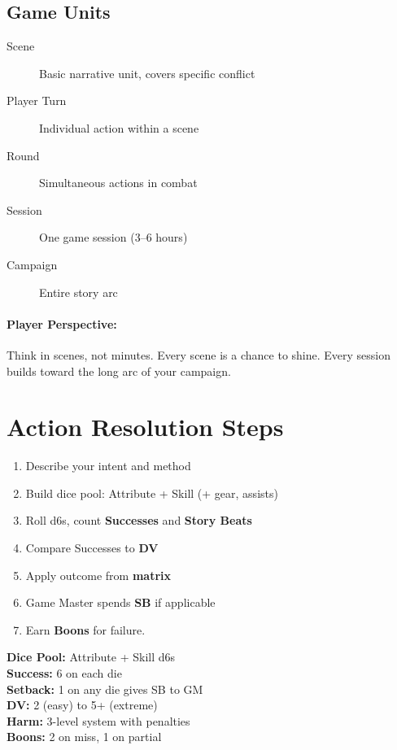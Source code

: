 \subsection*{Game Units}
\begin{description}
  \item[Scene] Basic narrative unit, covers specific conflict
  \item[Player Turn] Individual action within a scene
  \item[Round] Simultaneous actions in combat
  \item[Session] One game session (3--6 hours)
  \item[Campaign] Entire story arc
\end{description}

\paragraph{Player Perspective:}  
Think in scenes, not minutes. Every scene is a chance to shine. Every session builds toward the long arc of your campaign.

\section{Action Resolution Steps}

\begin{enumerate}
  \item Describe your intent and method
  \item Build dice pool: Attribute + Skill (+ gear, assists)
  \item Roll d6s, count \textbf{Successes} and \textbf{Story Beats}
  \item Compare Successes to \textbf{DV}
  \item Apply outcome from \textbf{matrix}
  \item Game Master spends \textbf{SB} if applicable
  \item Earn \textbf{Boons} for failure.
\end{enumerate}

\begin{tcolorbox}[colback=blue!5!white,colframe=blue!75!black,title=Quick Reference,fonttitle=\bfseries]
\textbf{Dice Pool:} Attribute + Skill d6s \\
\textbf{Success:} 6 on each die \\
\textbf{Setback:} 1 on any die gives SB to GM \\
\textbf{DV:} 2 (easy) to 5+ (extreme) \\
\textbf{Harm:} 3-level system with penalties \\
\textbf{Boons:} 2 on miss, 1 on partial 
\end{tcolorbox}


